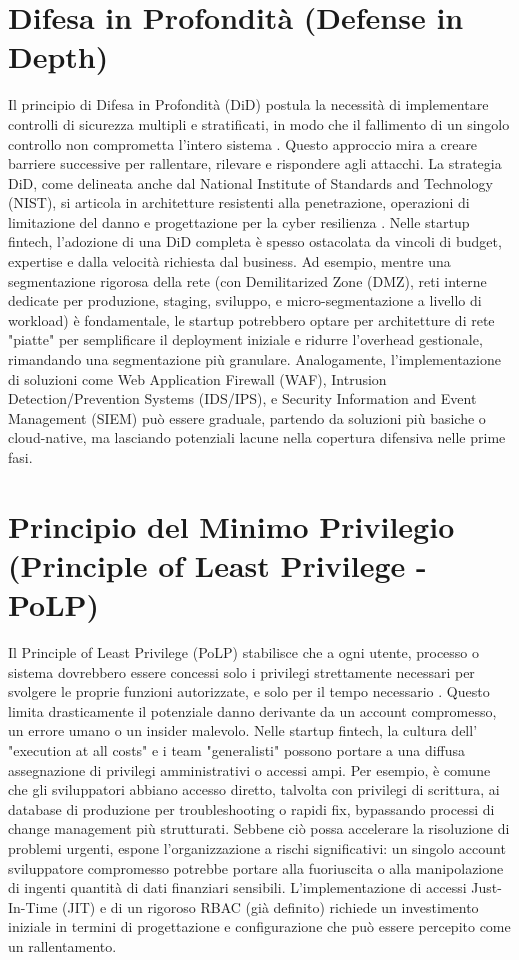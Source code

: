 \section{Difesa in Profondità (Defense in Depth)}
Il principio di Difesa in Profondità (DiD) postula la necessità di implementare controlli di sicurezza multipli e stratificati, in modo che il fallimento di un singolo controllo non comprometta l'intero sistema \cite{NIST_SP_800_53}. Questo approccio mira a creare barriere successive per rallentare, rilevare e rispondere agli attacchi. La strategia DiD, come delineata anche dal National Institute of Standards and Technology (NIST), si articola in architetture resistenti alla penetrazione, operazioni di limitazione del danno e progettazione per la cyber resilienza \cite{NIST_SP_800_172}.
Nelle startup fintech, l'adozione di una DiD completa è spesso ostacolata da vincoli di budget, expertise e dalla velocità richiesta dal business. Ad esempio, mentre una segmentazione rigorosa della rete (con Demilitarized Zone (DMZ), reti interne dedicate per produzione, staging, sviluppo, e micro-segmentazione a livello di workload) è fondamentale, le startup potrebbero optare per architetture di rete "piatte" per semplificare il deployment iniziale e ridurre l'overhead gestionale, rimandando una segmentazione più granulare. Analogamente, l'implementazione di soluzioni come Web Application Firewall (WAF), Intrusion Detection/Prevention Systems (IDS/IPS), e Security Information and Event Management (SIEM) può essere graduale, partendo da soluzioni più basiche o cloud-native, ma lasciando potenziali lacune nella copertura difensiva nelle prime fasi.
\section{Principio del Minimo Privilegio (Principle of Least Privilege - PoLP)}
Il Principle of Least Privilege (PoLP) stabilisce che a ogni utente, processo o sistema dovrebbero essere concessi solo i privilegi strettamente necessari per svolgere le proprie funzioni autorizzate, e solo per il tempo necessario \cite{NIST_Glossary}. Questo limita drasticamente il potenziale danno derivante da un account compromesso, un errore umano o un insider malevolo.
Nelle startup fintech, la cultura dell' "execution at all costs" e i team "generalisti" possono portare a una diffusa assegnazione di privilegi amministrativi o accessi ampi. Per esempio, è comune che gli sviluppatori abbiano accesso diretto, talvolta con privilegi di scrittura, ai database di produzione per troubleshooting o rapidi fix, bypassando processi di change management più strutturati. Sebbene ciò possa accelerare la risoluzione di problemi urgenti, espone l'organizzazione a rischi significativi: un singolo account sviluppatore compromesso potrebbe portare alla fuoriuscita o alla manipolazione di ingenti quantità di dati finanziari sensibili. L'implementazione di accessi Just-In-Time (JIT) e di un rigoroso RBAC (già definito) richiede un investimento iniziale in termini di progettazione e configurazione che può essere percepito come un rallentamento.
